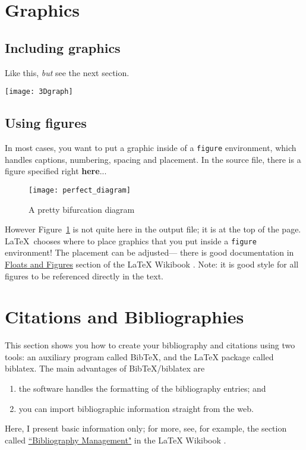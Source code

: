 \documentclass[11pt]{amsart}
\theoremstyle{definition}                  %
\theoremstyle{remark}                       %
\numberwithin{equation}{section}
\begin{document}
\section{Graphics}

\subsection{Including graphics}

Like this, \emph{but} see the next section. 

\bigskip

\noindent \texttt{[image: 3Dgraph]}

\bigskip

 
\subsection{Using figures}

In most cases, you want to put a graphic inside of 
a \texttt{figure} environment, which handles
captions, numbering, spacing and placement. 
In the source file, there is a figure specified right \textbf{here}...
 \begin{figure}
 \centering
 \texttt{[image: perfect\_diagram]}
\caption{A pretty bifurcation diagram}
 \label{perfect_fig}
 \end{figure}
 However Figure~\ref{perfect_fig} is not quite here in the output file;  it is at the top of the page. \LaTeX\ chooses where
 to place graphics that you put inside a \texttt{figure} environment!  The placement can be adjusted--- there is good documentation
in \href{http://en.wikibooks.org/wiki/LaTeX/Floats,_Figures_and_Captions}{Floats and Figures}  section of the LaTeX Wikibook \cite{wikibook}.
Note: it is good style for all figures to be referenced directly in the text.

\section{Citations and Bibliographies}


This section shows you how to create your bibliography and citations using two tools: an auxiliary program called BibTeX, and the LaTeX package called biblatex. 
The main advantages of BibTeX/biblatex are
\begin{enumerate}
\item the software handles the formatting of the bibliography entries; and
\item you can import bibliographic information straight from the web.
\end{enumerate}
Here, I present basic information only; for more, see, for example, the section called 
\href{https://en.wikibooks.org/wiki/LaTeX/Bibliography_Management}{``Bibliography Management"} in the LaTeX Wikibook \cite[\S 5.3]{wikibook}.
\end{document}
